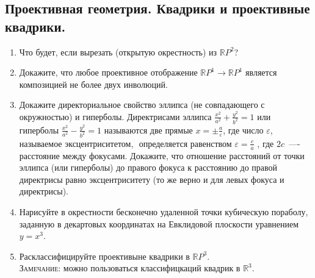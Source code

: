\documentclass[11pt]{article}
\begin{document}
    \subsection{Проективная геометрия. Квадрики и проективные квадрики. }
    \begin{enumerate}
        \item Что будет, если вырезать (открытую окрестность) из $\mathbb{R}P^2$?

        \item Докажите, что любое проективное отображение $\mathbb{R}P^1 \to \mathbb{R}P^1$ является композицией не более двух инволюций.

        \item Докажите директориальное свойство эллипса (не совпадающего с  окружностью) и гиперболы. Директрисами эллипса $\frac{x^2}{a^2} + \frac{y^2}{b^2} = 1$ или гиперболы  $\frac{x^2}{a^2} - \frac{y^2}{b^2} = 1$ называются две прямые $x = \pm\frac{a}{\varepsilon}$, где число $\varepsilon$, называемое эксцентриситетом,  определяется равенством $\varepsilon = \frac{c}{a}$ , где $2c$~—- расстояние между фокусами. Докажите, что отношение расстояний от точки эллипса (или гиперболы) до правого фокуса к расстоянию до правой директрисы равно эксцентриситету (то же верно и для левых фокуса и директрисы).

        \item Нарисуйте в окрестности бесконечно удаленной точки кубическую пораболу, заданную в декартовых координатах на Евклидовой плоскости
              уравнением $y = x^3$.

        \item Расклассифицируйте проективыне квадрики в $\mathbb{R}P^3$. \\
              \textsc{Замечание:} можно пользоваться классифицкаций квадрик в $\mathbb{R}^3$.
    \end{enumerate}
\end{document}
